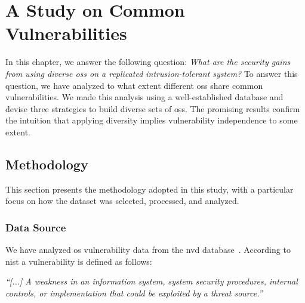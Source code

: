 \chapter{A Study on Common Vulnerabilities}
\label{chap:datasource}

In this chapter, we answer the following question: \emph{What are the security gains from using diverse \glspl{os} on a replicated intrusion-tolerant system?}
To answer this question, we have analyzed to what extent different \glspl{os} share common vulnerabilities.
We made this analysis using a well-established database and devise three strategies to build diverse sets of \glspl{os}.
The promising results confirm the intuition that applying diversity implies vulnerability independence to some extent.

\section{Methodology}

This section presents the methodology adopted in this study, with a particular focus on how the dataset was selected, processed, and analyzed.


\subsection{Data Source}
We have analyzed \gls{os} vulnerability data from the \gls{nvd} database~\cite{nvd}. 
According to \gls{nist} a vulnerability is defined as follows:

\begin{defn}
 \emph{``[...] A weakness in an information system, system security procedures, internal controls, or implementation that could be exploited by a threat source.''}~\cite{Nist:2012}
\end{defn}



